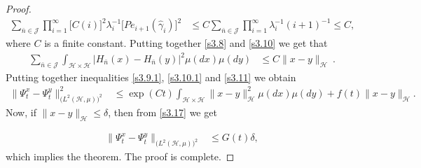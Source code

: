 \documentclass[review, onefignum, onetabnum]{siamart171218}
\begin{document}
\begin{proof}
\begin{align}
    \label{s3.10}
  \sum_{\bar n\in \mathcal{J}}  \prod_{i=1}^\infty \Big[C(i)\Big]^2
  \lambda_i^{-1} \Big[Pe_{i+1}(\hat \gamma_i)\Big]^2 & \le C \sum_{\bar n\in
    \mathcal{J}}  \prod_{i=1}^\infty
  \lambda_i^{-1}(i+1)^{-1}
  \le C,
\end{align}
where $C$ is a finite constant. Putting together \eqref{s3.8} and
\eqref{s3.10} we get that
\begin{align}
    \sum_{\bar n\in \mathcal{J}} \int_{\mathcal{H}\times \mathcal{H}}  \big|
    H_{\bar n}(x) -H_{\bar n}(y) \big|^2 \mu(dx)\mu(dy) &\le
    C \| x-y\|_{\mathcal{H}} \ .
    \label{s3.11}
\end{align}
Putting together inequalities \eqref{s3.9.1}, \eqref{s3.10.1} and
\eqref{s3.11} we obtain
\begin{align}
  \| \Psi_t^x-\Psi_t^y\|_{\big(L^2(\mathcal{H},\mu) \big)^2}^2&\le   \exp(Ct)
  \int_{\mathcal{H}\times \mathcal{H}}
  \| x-y\|_{\mathcal{H}}^2 \mu(dx)\mu(dy) +  f(t)\| x-y\|_{\mathcal{H}}.
  \label{s3.17}
\end{align}
Now, if $\| x-y\|_{\mathcal{H}}\le \delta $, then from \eqref{s3.17} we get

\begin{align}
 \| \Psi_t^x-\Psi_t^y\|_{\big(L^2(\mathcal{H},\mu) \big)^2} &\le
  G(t) \delta, \label{s3.12}
\end{align}
which implies the theorem. The proof is complete.
\end{proof}
\end{document}
